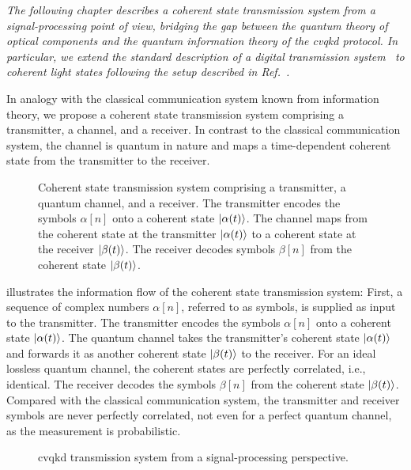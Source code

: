 \textit{The following chapter describes a coherent state transmission system from a signal-processing point of view, bridging the gap between the quantum theory of optical components and the quantum information theory of the \gls{cvqkd} protocol. In particular, we extend the standard description of a digital transmission system~\cite{Gallager2008,Nossek2015,Oppenheim1989,Proakis2007} to coherent light states following the setup described in Ref.~\cite{Brunner2017}.}

In analogy with the classical communication system known from information theory, we propose a coherent state transmission system comprising a transmitter, a channel, and a receiver.
In contrast to the classical communication system, the channel is quantum in nature and maps a time-dependent coherent state from the transmitter to the receiver.
\begin{figure}[htb]
	\centering
	
	\caption{Coherent state transmission system comprising a transmitter, a quantum channel, and a receiver. The transmitter encodes the symbols $\alpha[n]$ onto a coherent state $\ket{\alpha(t)}$. The channel maps from the coherent state at the transmitter $\ket{\alpha(t)}$ to a coherent state at the receiver $\ket{\beta(t)}$. The receiver decodes symbols $\beta[n]$ from the coherent state $\ket{\beta(t)}$.}\label{fig:transmission_system}
\end{figure}
 illustrates the information flow of the coherent state transmission system:
First, a sequence of complex numbers $\alpha[n]$, referred to as symbols, is supplied as input to the transmitter.
The transmitter encodes the symbols $\alpha[n]$ onto a coherent state $\ket{\alpha(t)}$.
The quantum channel takes the transmitter's coherent state $\ket{\alpha(t)}$ and forwards it as another coherent state $\ket{\beta(t)}$ to the receiver.
For an ideal lossless quantum channel, the coherent states are perfectly correlated, i.e., identical.
The receiver decodes the symbols $\beta[n]$ from the coherent state $\ket{\beta(t)}$.
Compared with the classical communication system, the transmitter and receiver symbols are never perfectly correlated, not even for a perfect quantum channel, as the measurement is probabilistic.
\begin{figure}[htb]
	\centering
	
	\caption{\Gls{cvqkd} transmission system from a signal-processing perspective.}
\end{figure}